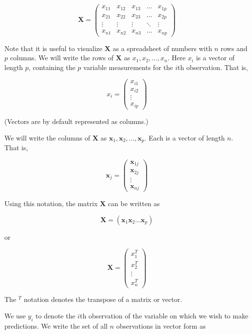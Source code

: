 \documentclass[]{book}
\begin{document}
\[ \textbf{X}  = \begin{pmatrix}
    x_{11} & x_{12} & x_{13} & \dots  & x_{1p} \\
    x_{21} & x_{22} & x_{23} & \dots  & x_{2p} \\
    \vdots & \vdots & \vdots & \ddots & \vdots \\
    x_{n1} & x_{n2} & x_{n3} & \dots  & x_{np}
\end{pmatrix} \]

Note that it is useful to visualize \(\textbf{X}\) as a spreadsheet of
numbers with \(n\) rows and \(p\) columns. We will write the rows of
\(\textbf{X}\) as \(x_1 , x_2 , \ldots, x_n\). Here \(x_i\) is a vector
of length \(p\), containing the \(p\) variable measurements for the
\(i\)th observation. That is,

\[ x_i = \begin{pmatrix}
    x_{i1} \\
    x_{i2} \\
    \vdots \\
    x_{ip}
\end{pmatrix}\]

(Vectors are by default represented as columns.)

We will write the columns of \(\textbf{X}\) as
\(\textbf{x}_1 , \textbf{x}_2, \ldots, \textbf{x}_p\). Each is a vector
of length \(n\). That is,

\[ \textbf{x}_j = \begin{pmatrix}
    \textbf{x}_{1j} \\
    \textbf{x}_{2j} \\
    \vdots \\
    \textbf{x}_{nj}
\end{pmatrix}\]

Using this notation, the matrix \(\textbf{X}\) can be written as

\[ \textbf{X} = (\textbf{x}_1  \textbf{x}_2 \ldots \textbf{x}_p) \]

or

\[ \textbf{X} = \begin{pmatrix}
    x_{1}^T \\
    x_{2}^T \\
    \vdots \\
    x_{n}^T
\end{pmatrix}\]

The \(^T\) notation denotes the transpose of a matrix or vector.

We use \(y_i\) to denote the \(i\)th observation of the variable on
which we wish to make predictions. We write the set of all \(n\)
observations in vector form as
\end{document}
